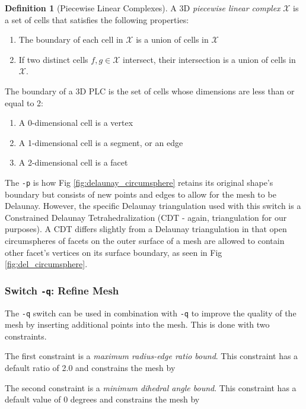 \documentclass[ma]{uncgdissertationexp}
\theoremstyle{plain}
\theoremstyle{definition}
\newtheorem{definition}[theorem]{Definition}
\theoremstyle{remark}
\begin{document}
\begin{definition}[Piecewise Linear Complexes]
\par A 3D \textit{piecewise linear complex} $\mathcal{X}$ is a set of cells that satisfies the following properties:
\begin{enumerate}
\item The boundary of each cell in $\mathcal{X}$ is a union of cells in $\mathcal{X}$
\item If two distinct cells $f, g \in \mathcal{X}$ intersect, their intersection is a union of cells in $\mathcal{X}$.
\end{enumerate}
\par The boundary of a 3D PLC is the set of cells whose dimensions are less than or equal to 2:
\begin{enumerate}
\item A 0-dimensional cell is a vertex
\item A 1-dimensional cell is a segment, or an edge
\item A 2-dimensional cell is a facet
\end{enumerate}
\end{definition}

The \verb"-p" is how Fig \ref{fig:delaunay_circumsphere} retains its original shape's boundary but consists of new points and edges to allow for the mesh to be Delaunay. However, the specific Delaunay triangulation used with this switch is a Constrained Delaunay Tetrahedralization (CDT - again, triangulation for our purposes). A CDT differs slightly from a Delaunay triangulation in that open circumspheres of facets on the outer surface of a mesh are allowed to contain other facet's vertices on its surface boundary, as seen in Fig \ref{fig:del_circumsphere}.

\cprotect\subsubsection{Switch \verb+-q+: Refine Mesh}
\par The \verb"-q" switch can be used in combination with \verb"-q" to improve the quality of the mesh by inserting additional points into the mesh. This is done with two constraints.
\par The first constraint is a \textit{maximum radius-edge ratio bound}. This constraint has a default ratio of 2.0 and constrains the mesh by 
\par The second constraint is a \textit{minimum dihedral angle bound}. This constraint has a default value of 0 degrees and constrains the mesh by
\end{document}
